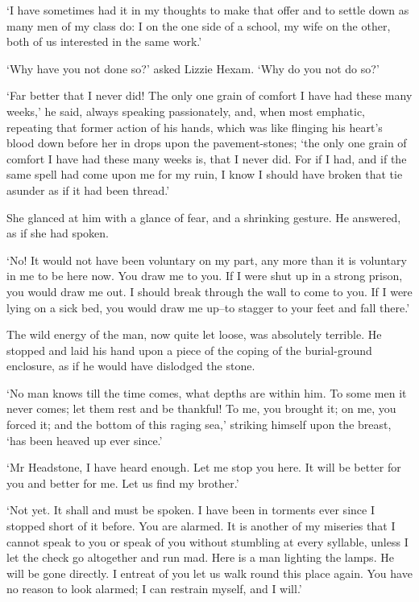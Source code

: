‘I have sometimes had it in my thoughts to make that offer and to settle
down as many men of my class do: I on the one side of a school, my wife
on the other, both of us interested in the same work.’

‘Why have you not done so?’ asked Lizzie Hexam. ‘Why do you not do so?’

‘Far better that I never did! The only one grain of comfort I have had
these many weeks,’ he said, always speaking passionately, and, when
most emphatic, repeating that former action of his hands, which was
like flinging his heart’s blood down before her in drops upon the
pavement-stones; ‘the only one grain of comfort I have had these many
weeks is, that I never did. For if I had, and if the same spell had come
upon me for my ruin, I know I should have broken that tie asunder as if
it had been thread.’

She glanced at him with a glance of fear, and a shrinking gesture. He
answered, as if she had spoken.

‘No! It would not have been voluntary on my part, any more than it is
voluntary in me to be here now. You draw me to you. If I were shut up in
a strong prison, you would draw me out. I should break through the wall
to come to you. If I were lying on a sick bed, you would draw me up--to
stagger to your feet and fall there.’

The wild energy of the man, now quite let loose, was absolutely
terrible. He stopped and laid his hand upon a piece of the coping of the
burial-ground enclosure, as if he would have dislodged the stone.

‘No man knows till the time comes, what depths are within him. To some
men it never comes; let them rest and be thankful! To me, you brought
it; on me, you forced it; and the bottom of this raging sea,’ striking
himself upon the breast, ‘has been heaved up ever since.’

‘Mr Headstone, I have heard enough. Let me stop you here. It will be
better for you and better for me. Let us find my brother.’

‘Not yet. It shall and must be spoken. I have been in torments ever
since I stopped short of it before. You are alarmed. It is another of my
miseries that I cannot speak to you or speak of you without stumbling at
every syllable, unless I let the check go altogether and run mad. Here
is a man lighting the lamps. He will be gone directly. I entreat of you
let us walk round this place again. You have no reason to look alarmed;
I can restrain myself, and I will.’

